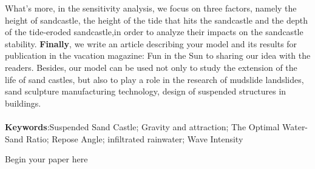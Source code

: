 \documentclass[12pt]{article}
\begin{document}
What's more, in the sensitivity analysis, we focus on three factors, namely the height of sandcastle, the height of the tide that hits the sandcastle and the depth of the tide-eroded sandcastle,in order to analyze their impacts on the sandcastle stability. \textbf{Finally}, we write an article describing your model and its results for publication in the vacation magazine: Fun in the Sun to sharing our idea with the readers. Besides, our model can be used not only to study the extension of the life of sand castles, but also to play a role in the research of mudslide landslides, sand sculpture manufacturing technology, design of suspended structures in buildings.
\\
\\
\large{\textbf{Keywords}:Suspended Sand Castle; Gravity and attraction; The Optimal Water-Sand Ratio; Repose Angle; infiltrated rainwater; Wave Intensity}

\clearpage
\pagestyle{fancy}
\newpage
\setcounter{page}{1}
Begin your paper here


\end{document}
